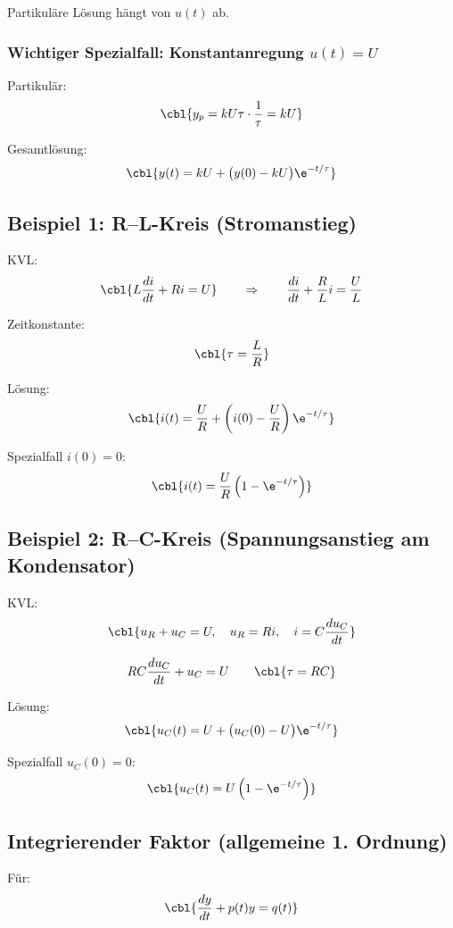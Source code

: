 Partikuläre Lösung hängt von $u(t)$ ab.

\subsubsection{Wichtiger Spezialfall: Konstantanregung $u(t)=U$}

Partikulär:
\[
\cbl{y_p = k U \tau \cdot \frac{1}{\tau} = kU}
\]

Gesamtlösung:
\[
\cbl{y(t) = kU + \big(y(0)-kU\big)\e^{-t/\tau}}
\]


\subsection{Beispiel 1: R--L-Kreis (Stromanstieg)}

KVL:
\[
\cbl{L\frac{di}{dt} + Ri = U}
\qquad
\Rightarrow
\qquad
\frac{di}{dt} + \frac{R}{L} i = \frac{U}{L}
\]

Zeitkonstante:
\[
\cbl{\tau = \frac{L}{R}}
\]

Lösung:
\[
\cbl{i(t) = \frac{U}{R} + \left(i(0) - \frac{U}{R}\right)\e^{-t/\tau}}
\]

Spezialfall $i(0)=0$:
\[
\cbl{i(t) = \frac{U}{R}\left(1-\e^{-t/\tau}\right)}
\]

\subsection{Beispiel 2: R--C-Kreis (Spannungsanstieg am Kondensator)}

KVL:
\[
\cbl{u_R + u_C = U,\quad u_R = Ri,\quad i = C\frac{du_C}{dt}}
\]

\[
RC\frac{du_C}{dt}+u_C = U
\qquad
\cbl{\tau = RC}
\]

Lösung:
\[
\cbl{u_C(t) = U + \big(u_C(0)-U\big)\e^{-t/\tau}}
\]

Spezialfall $u_C(0)=0$:
\[
\cbl{u_C(t) = U\left(1-\e^{-t/\tau}\right)}
\]

\subsection{Integrierender Faktor (allgemeine 1. Ordnung)}

Für:
\[
\cbl{\frac{dy}{dt} + p(t) y = q(t)}
\]

